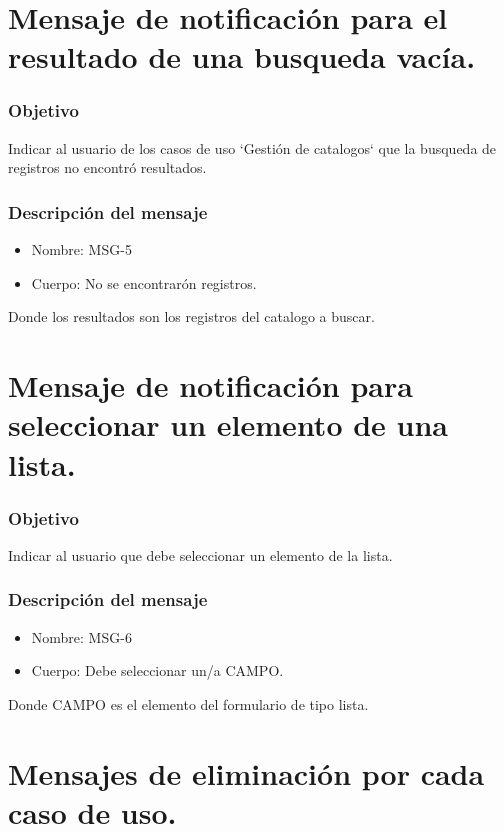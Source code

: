 \section{Mensaje de notificación para el resultado de una busqueda vacía.}\label{MSG5}

\subsubsection{Objetivo}
Indicar al usuario de los casos de uso `Gestión de catalogos` que la busqueda de registros no encontró resultados.

\subsubsection{Descripción del mensaje}
\begin{itemize}
\item Nombre: MSG-5
\item Cuerpo: No se encontrarón registros.

\end{itemize}
Donde los resultados son los registros del catalogo a buscar.


\section{Mensaje de notificación para seleccionar un elemento de una lista.}\label{MSG6}

\subsubsection{Objetivo}
Indicar al usuario que debe seleccionar un elemento de la lista.

\subsubsection{Descripción del mensaje}
\begin{itemize}
\item Nombre: MSG-6
\item Cuerpo: Debe seleccionar un/a CAMPO.

\end{itemize}
Donde CAMPO es el elemento del formulario de tipo lista.


\section{Mensajes de eliminación por cada caso de uso.}

